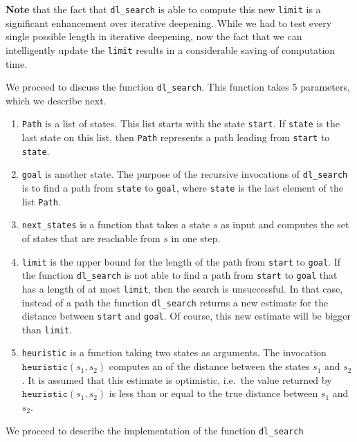 \begin{enumerate}
\begin{enumerate}
            \textbf{Note} that the fact that \texttt{dl\_search} is able to compute this new \texttt{limit} is
            a significant enhancement over iterative deepening.  While we had to test every single possible
            length in iterative deepening, now the fact that we can intelligently update the \texttt{limit}
            results in a considerable saving of computation time.
      \end{enumerate}
\end{enumerate}
We proceed to discuss the function \texttt{dl\_search}.  This function takes 5 parameters, which we describe next.
\begin{enumerate}
\item \texttt{Path} is a list of states.  This list starts with the state \texttt{start}.
      If \texttt{state} is the last state on this list, then \texttt{Path} represents a path leading from
      \texttt{start} to \texttt{state}.
\item \texttt{goal} is another state.  The purpose of the recursive invocations of \texttt{dl\_search} is to
      find a path from \texttt{state} to \texttt{goal}, where \texttt{state} is the last element of the
      list \texttt{Path}.
\item \texttt{next\_states} is a function that takes a state $s$ as input and computes the set of states that are
      reachable from $s$ in one step.
\item \texttt{limit} is the upper bound for the length of the path from \texttt{start} to \texttt{goal}.  If the
      function \texttt{dl\_search} is not able to find a path from \texttt{start} to \texttt{goal} that has
      a length of at most \texttt{limit}, then the search is unsuccessful.  In that case, instead of a path
      the function \texttt{dl\_search} returns a new estimate for the distance between \texttt{start} and
      \texttt{goal}.  Of course, this new estimate will be bigger than \texttt{limit}.
\item \texttt{heuristic} is a function taking two states as arguments.  The invocation
      $\texttt{heuristic}(s_1, s_2)$ computes an  of the distance between the states $s_1$ and $s_2$.  It is
      assumed that this estimate is optimistic, i.e.~the value returned by $\texttt{heuristic}(s_1, s_2)$
      is less than or equal to the true distance between $s_1$ and $s_2$.
\end{enumerate}
We proceed to describe the implementation of the function \texttt{dl\_search}
